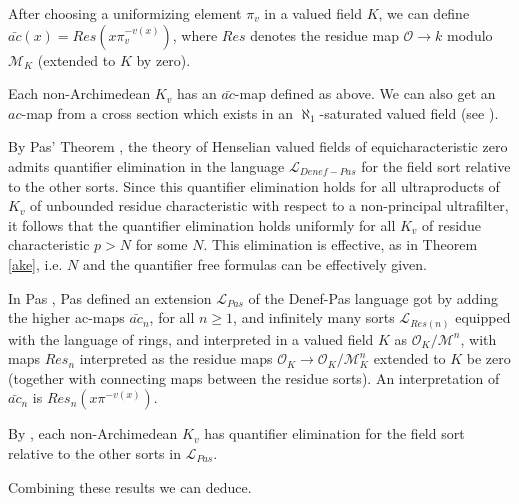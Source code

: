 \documentclass[12pt]{amsart}
\def\cL{\mathcal{L}}
\def\cL{\mathcal{L}}
\def\cM{\mathcal M}
\def\cO{\mathcal{O}}
\numberwithin{equation}{section}
\begin{document}
After choosing a uniformizing element $\pi_v$ in a valued field $K$, we can define $\bar{ac}(x)=Res(x\pi_v^{-v(x)})$, where $Res$ denotes the residue map $\cO\rightarrow k$ modulo $\cM_K$ (extended to $K$ by zero).

Each non-Archimedean $K_v$ has an $\bar{ac}$-map defined as above. We can also get an $ac$-map from a cross section which exists in an $\aleph_1$-saturated valued field (see \cite{cherlin-book}). 

By Pas' Theorem \cite[Theorem 4.1, pp.155]{pas}, the theory of Henselian valued fields of equicharacteristic zero admits quantifier elimination in the language $\cL_{Denef-Pas}$ for the field sort relative to the other sorts.  Since this quantifier elimination holds for all ultraproducts of $K_v$ of unbounded residue characteristic with respect to a non-principal ultrafilter, 
it follows that the quantifier elimination holds uniformly for all $K_v$ of residue characteristic $p>N$ for some $N$. This elimination is effective, as in Theorem \ref{ake}, i.e. $N$ and the quantifier free formulas can be effectively given.

In Pas \cite{pas2}, Pas defined an extension $\cL_{Pas}$ of the Denef-Pas language got by adding the higher ac-maps $\bar{ac}_n$, for all $n\geq 1$, and infinitely many sorts
$\cL_{Res(n)}$ equipped with the language of rings, and interpreted in a valued field $K$ as $\cO_K/\cM^n$, with maps $Res_n$ interpreted as the residue maps $\cO_K\rightarrow \cO_K/\cM_K^n$ extended to $K$ be zero 
(together with connecting maps between the residue sorts). An interpretation of $\bar{ac}_n$ is $Res_n(x \pi^{-v(x)})$. 

By \cite{pas2}, each non-Archimedean $K_v$ has quantifier elimination for the field sort relative to the other sorts in $\cL_{Pas}$.

Combining these results we can deduce.
\end{document}
